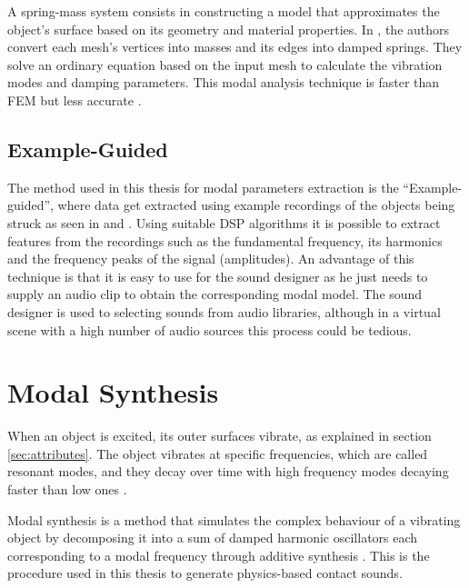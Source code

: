 A spring-mass system consists in constructing a model that approximates the object's surface based on its geometry and material properties. In \cite{raghuvanshi2006interactive}, the authors convert each mesh's vertices into masses and its edges into damped springs. They solve an ordinary equation based on the input mesh to calculate the vibration modes and damping parameters. This modal analysis technique is faster than \gls{FEM} but less accurate \cite{ren2010synthesizing}.

\subsection{Example-Guided}\label{sec:exampleguided}

The method used in this thesis for modal parameters extraction is the ``Example-guided'', where data get extracted using example recordings of the objects being struck as seen in \cite{lloyd2011sound} and \cite{ren2013example}. Using suitable \gls{DSP} algorithms it is possible to extract features from the recordings such as the fundamental frequency, its harmonics and the frequency peaks of the signal (amplitudes). An advantage of this technique is that it is easy to use for the sound designer as he just needs to supply an audio clip to obtain the corresponding modal model. The sound designer is used to selecting sounds from audio libraries, although in a virtual scene with a high number of audio sources this process could be tedious.

 
\section{Modal Synthesis}\label{sec:modal_synth}


When an object is excited, its outer surfaces vibrate, as explained in section \ref{sec:attributes}. The object vibrates at specific frequencies, which are called resonant modes, and they decay over time with high frequency modes decaying faster than low ones \cite{lloyd2011sound}. 

Modal synthesis is a method that simulates the complex behaviour of a vibrating object by decomposing it into a sum of damped harmonic oscillators each corresponding to a modal frequency through additive synthesis \cite{bilbao2009numerical}. This is the procedure used in this thesis to generate physics-based contact sounds.


